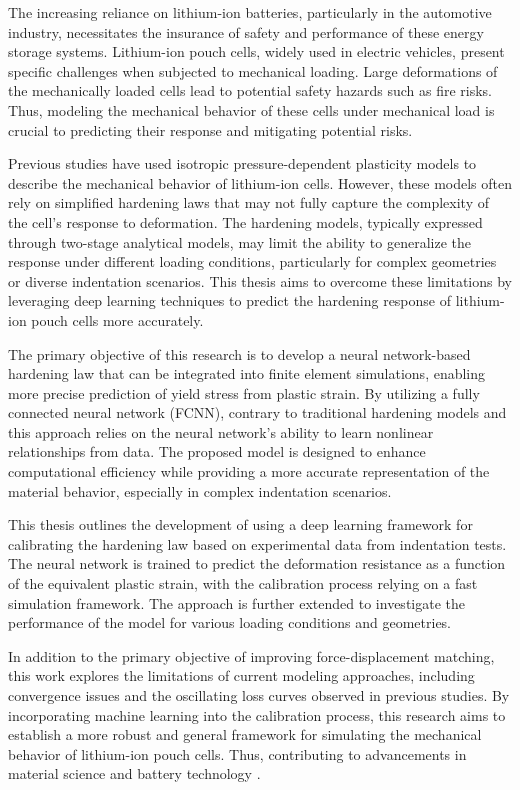 The increasing reliance on lithium-ion batteries, particularly in the automotive industry, necessitates the insurance of safety and performance of these energy storage systems. Lithium-ion pouch cells, widely used in electric vehicles, present specific challenges when subjected to mechanical loading. Large deformations of the mechanically loaded cells lead to potential safety hazards such as fire risks. Thus, modeling the mechanical behavior of these cells under mechanical load is crucial to predicting their response and mitigating potential risks.

Previous studies have used isotropic pressure-dependent plasticity models to describe the mechanical behavior of lithium-ion cells. However, these models often rely on simplified hardening laws that may not fully capture the complexity of the cell’s response to deformation. The hardening models, typically expressed through two-stage analytical models, may limit the ability to generalize the response under different loading conditions, particularly for complex geometries or diverse indentation scenarios. This thesis aims to overcome these limitations by leveraging deep learning techniques to predict the hardening response of lithium-ion pouch cells more accurately.

The primary objective of this research is to develop a neural network-based hardening law that can be integrated into finite element simulations, enabling more precise prediction of yield stress from plastic strain. By utilizing a fully connected neural network (FCNN), contrary to traditional hardening models and this approach relies on the neural network's ability to learn nonlinear relationships from data. The proposed model is designed to enhance computational efficiency while providing a more accurate representation of the material behavior, especially in complex indentation scenarios.

This thesis outlines the development of using a deep learning framework for calibrating the hardening law based on experimental data from indentation tests. The neural network is trained to predict the deformation resistance as a function of the equivalent plastic strain, with the calibration process relying on a fast simulation framework. The approach is further extended to investigate the performance of the model for various loading conditions and geometries.

In addition to the primary objective of improving force-displacement matching, this work explores the limitations of current modeling approaches, including convergence issues and the oscillating loss curves observed in previous studies. By incorporating machine learning into the calibration process, this research aims to establish a more robust and general framework for simulating the mechanical behavior of lithium-ion pouch cells. Thus, contributing to advancements in material science and battery technology \citep{Tancogne-Ind}.
